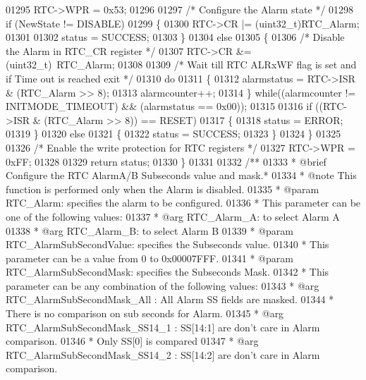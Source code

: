 \begin{DoxyCode}
01295   RTC->WPR = 0x53;
01296 
01297   \textcolor{comment}{/* Configure the Alarm state */}
01298   \textcolor{keywordflow}{if} (NewState != DISABLE)
01299   \{
01300     RTC->CR |= (uint32\_t)RTC\_Alarm;
01301 
01302     status = SUCCESS;
01303   \}
01304   \textcolor{keywordflow}{else}
01305   \{
01306     \textcolor{comment}{/* Disable the Alarm in RTC\_CR register */}
01307     RTC->CR &= (uint32\_t)~RTC\_Alarm;
01308 
01309     \textcolor{comment}{/* Wait till RTC ALRxWF flag is set and if Time out is reached exit */}
01310     \textcolor{keywordflow}{do}
01311     \{
01312       alarmstatus = RTC->ISR & (RTC\_Alarm >> 8);
01313       alarmcounter++;
01314     \} \textcolor{keywordflow}{while}((alarmcounter != INITMODE_TIMEOUT) && (alarmstatus == 0x00));
01315 
01316     \textcolor{keywordflow}{if} ((RTC->ISR & (RTC\_Alarm >> 8)) == RESET)
01317     \{
01318       status = ERROR;
01319     \}
01320     \textcolor{keywordflow}{else}
01321     \{
01322       status = SUCCESS;
01323     \}
01324   \}
01325 
01326   \textcolor{comment}{/* Enable the write protection for RTC registers */}
01327   RTC->WPR = 0xFF;
01328 
01329   \textcolor{keywordflow}{return} status;
01330 \}
01331 
01332 \textcolor{comment}{/**}
01333 \textcolor{comment}{  * @brief  Configure the RTC AlarmA/B Subseconds value and mask.*}
01334 \textcolor{comment}{  * @note   This function is performed only when the Alarm is disabled. }
01335 \textcolor{comment}{  * @param  RTC\_Alarm: specifies the alarm to be configured.}
01336 \textcolor{comment}{  *   This parameter can be one of the following values:}
01337 \textcolor{comment}{  *     @arg RTC\_Alarm\_A: to select Alarm A}
01338 \textcolor{comment}{  *     @arg RTC\_Alarm\_B: to select Alarm B}
01339 \textcolor{comment}{  * @param  RTC\_AlarmSubSecondValue: specifies the Subseconds value.}
01340 \textcolor{comment}{  *   This parameter can be a value from 0 to 0x00007FFF.}
01341 \textcolor{comment}{  * @param  RTC\_AlarmSubSecondMask:  specifies the Subseconds Mask.}
01342 \textcolor{comment}{  *   This parameter can be any combination of the following values:}
01343 \textcolor{comment}{  *     @arg RTC\_AlarmSubSecondMask\_All    : All Alarm SS fields are masked.}
01344 \textcolor{comment}{  *                                          There is no comparison on sub seconds for Alarm.}
01345 \textcolor{comment}{  *     @arg RTC\_AlarmSubSecondMask\_SS14\_1 : SS[14:1] are don't care in Alarm comparison.}
01346 \textcolor{comment}{  *                                          Only SS[0] is compared}
01347 \textcolor{comment}{  *     @arg RTC\_AlarmSubSecondMask\_SS14\_2 : SS[14:2] are don't care in Alarm comparison.}

\end{DoxyCode}
